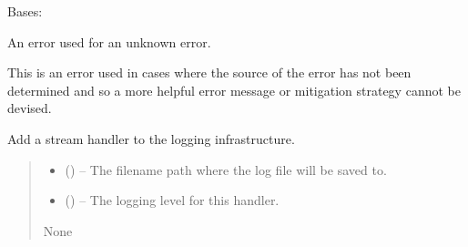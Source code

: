 \documentclass[letterpaper,11pt,english]{sphinxmanual}
\begin{document}
\begin{savenotes}\begin{fulllineitems}
\label{\detokenize{code/lezargus.library.logging:lezargus.library.logging.UndiscoveredError}}
\pysigstartsignatures
{}
\pysigstopsignatures
\sphinxAtStartPar
Bases: {\hyperref[\detokenize{code/lezargus.library.logging:lezargus.library.logging.LezargusBaseError}]{}}

\sphinxAtStartPar
An error used for an unknown error.

\sphinxAtStartPar
This is an error used in cases where the source of the error has not
been determined and so a more helpful error message or mitigation strategy
cannot be devised.

\end{fulllineitems}\end{savenotes}


\begin{savenotes}\begin{fulllineitems}
\label{\detokenize{code/lezargus.library.logging:lezargus.library.logging.add_file_logging_handler}}
\pysigstartsignatures
{}
\pysigstopsignatures
\sphinxAtStartPar
Add a stream handler to the logging infrastructure.
\begin{quote}\begin{description}
\begin{itemize}
\item {} 
\sphinxAtStartPar
{} () – The filename path where the log file will be saved to.

\item {} 
\sphinxAtStartPar
{} () – The logging level for this handler.

\end{itemize}

\sphinxAtStartPar
None

\end{description}\end{quote}

\end{fulllineitems}\end{savenotes}
\end{document}
